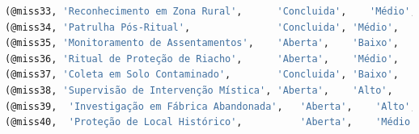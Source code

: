 \documentclass[12pt,a4paper]{report}
\begin{document}
\begin{lstlisting}[language=SQL, caption=population.sql]
(@miss33, 'Reconhecimento em Zona Rural',      'Concluida',    'Médio',  'Catalogar fenômenos discretos',  '2025-03-27 08:00:00', '2025-04-20', @addr54, @hq2),
(@miss34, 'Patrulha Pós-Ritual',               'Concluida', 'Médio',  'Garantir dissipação de energia',    '2025-03-12 12:00:00', '2025-04-02', @addr55, @hq2),
(@miss35, 'Monitoramento de Assentamentos',    'Aberta',    'Baixo',  'Estabelecer perímetro seguro',      '2025-05-30 07:00:00', NULL,         @addr56, @hq2),
(@miss36, 'Ritual de Proteção de Riacho',      'Aberta',    'Médio',  'Evitar contaminação espiritual',    '2025-06-02 06:30:00', NULL,         @addr57, @hq2),
(@miss37, 'Coleta em Solo Contaminado',        'Concluida', 'Baixo',  'Extração controlada',               '2025-03-12 10:00:00', '2025-04-13', @addr58, @hq2),
(@miss38, 'Supervisão de Intervenção Mística', 'Aberta',    'Alto',   'Acompanhar conjuradores',           '2025-06-03 08:00:00', NULL,         @addr59, @hq2),
(@miss39,  'Investigação em Fábrica Abandonada',   'Aberta',    'Alto',   'Examinar fenômenos',             '2025-05-08 14:00:00', NULL,         @addr7,  @hq2),
(@miss40,  'Proteção de Local Histórico',          'Aberta',    'Médio',  'Garantir segurança',             '2025-05-15 09:00:00', NULL,         @addr8,  @hq2),


\end{lstlisting}
\end{document}
